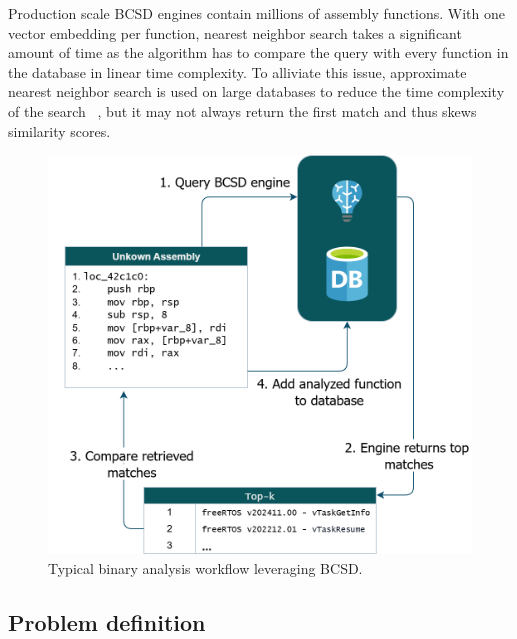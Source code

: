\documentclass[conference,compsoc]{IEEEtran}
\begin{document}
Production scale BCSD engines contain millions of assembly functions. With one vector embedding per function, nearest neighbor
search takes a significant amount of time as the algorithm has to compare the query with every function in the database in linear
time complexity. To alliviate this issue, approximate nearest neighbor search is used on large databases to reduce the time
complexity of the search ~\cite{ANN,ANN-limits}, but it may not always return the first match and thus skews similarity scores.

\begin{figure}[t]
\centerline{\includegraphics[width=\linewidth]{BCSD-schematic}}
\caption{Typical binary analysis workflow leveraging BCSD.}
\label{BCSD-workflow}
\end{figure}

\subsection{Problem definition}
\end{document}
